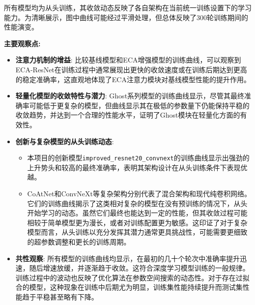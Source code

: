 \documentclass[a4paper]{article}
\begin{document}
\begin{description}
所有模型均为从头训练，其收敛动态反映了各自架构在当前统一训练设置下的学习能力。为清晰展示，图中曲线可能经过平滑处理，但总体反映了300轮训练期间的性能演变。

\textbf{主要观察点:}
\begin{itemize}
    \item \textbf{注意力机制的增益}: 比较基线模型和ECA增强模型的训练曲线，可以观察到ECA-ResNet在训练过程中通常展现出更快的收敛速度或在训练后期达到更高的稳定准确率，这直观地体现了ECA注意力模块对基线模型性能的提升作用。
    \item \textbf{轻量化模型的收敛特性与潜力}: Ghost系列模型的训练曲线显示，尽管其最终准确率可能低于更复杂的模型，但曲线显示其在极低的参数量下仍能保持平稳的收敛趋势，并达到一个合理的性能水平，证明了Ghost模块在轻量化方面的有效性。
    \item \textbf{创新与复杂模型的从头训练动态}:
    \begin{itemize}
        \item 本项目的创新模型\texttt{improved\_resnet20\_convnext}的训练曲线显示出强劲的上升势头和较高的最终准确率，表明其架构设计在从头训练条件下表现优越。
        \item CoAtNet和ConvNeXt等复杂架构分别代表了混合架构和现代纯卷积网络。它们的训练曲线揭示了这类相对复杂的模型在没有预训练的情况下，从头开始学习的动态。虽然它们最终也能达到一定的性能，但其收敛过程可能相较于简单模型更为漫长，或者对训练配置更为敏感。这印证了对于复杂模型而言，从头训练以充分发挥其潜力通常更具挑战性，可能需要更细致的超参数调整和更长的训练周期。
    \end{itemize}
    \item \textbf{共性观察}: 所有模型的训练曲线均显示，在最初的几十个轮次中准确率提升迅速，随后增速放缓，并逐渐趋于收敛。这符合深度学习模型训练的一般规律。训练过程中的波动也反映了优化算法在参数空间搜索的动态性。对于存在过拟合的模型，这种现象在训练中后期尤为明显，训练集性能持续提升而测试集性能趋于平稳甚至略有下降。
\end{itemize}


\end{description}
\end{document}
